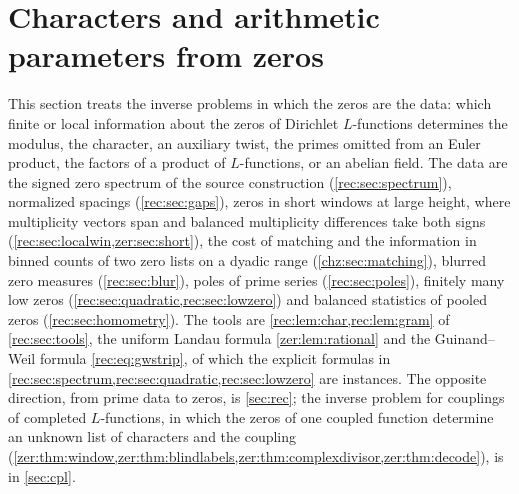 \providecommand{\recsinc}{\operatorname{sinc}}
\providecommand{\recgE}{\gamma_{\mathrm{E}}}
\providecommand{\recGen}{\operatorname{Gen}}
\providecommand{\recav}{\operatorname{av}}
\providecommand{\recA}{\mathcal{A}}
\providecommand{\recartanh}{\operatorname{artanh}}
\providecommand{\zerJ}{\mathcal{J}}
\providecommand{\zerK}{\mathcal{K}}
\providecommand{\zersinc}{\operatorname{sinc}}
\providecommand{\zergE}{\gamma_{\mathrm{E}}}
\providecommand{\zerLL}{\mathcal{L}}
\providecommand{\zerconv}{\operatorname{conv}}
\providecommand{\zerdiag}{\operatorname{diag}}
\providecommand{\zerSym}{\mathfrak{D}}
\providecommand{\zerLog}{\operatorname{Log}}
\providecommand{\chzA}{\mathcal{A}}
\providecommand{\chzB}{\mathcal{B}}
\providecommand{\chzC}{\mathcal{C}}
\providecommand{\chzEx}{\mathbb{E}}
\section{Characters and arithmetic parameters from zeros}\label{sec:chz}

This section treats the inverse problems in which the zeros are the data: which finite or local
information about the zeros of Dirichlet $L$-functions determines the modulus, the character, an
auxiliary twist, the primes omitted from an Euler product, the factors of a product of
$L$-functions, or an abelian field. The data are the signed zero spectrum of
the source construction (\cref{rec:sec:spectrum}), normalized spacings (\cref{rec:sec:gaps}), zeros in
short windows at large height, where multiplicity vectors span and balanced multiplicity differences
take both signs (\cref{rec:sec:localwin,zer:sec:short}), the cost of matching and the information in binned
counts of two zero lists on a dyadic range (\cref{chz:sec:matching}), blurred zero measures (\cref{rec:sec:blur}),
poles of prime series (\cref{rec:sec:poles}), finitely many low zeros
(\cref{rec:sec:quadratic,rec:sec:lowzero}) and balanced statistics of pooled zeros
(\cref{rec:sec:homometry}). The tools are \cref{rec:lem:char,rec:lem:gram} of \cref{rec:sec:tools}, the
uniform Landau formula \cref{zer:lem:rational} and the Guinand--Weil formula \eqref{rec:eq:gwstrip},
of which the explicit formulas in \cref{rec:sec:spectrum,rec:sec:quadratic,rec:sec:lowzero} are
instances. The opposite direction, from prime
data to zeros, is \cref{sec:rec}; the inverse problem for couplings of completed $L$-functions, in which
the zeros of one coupled function determine an unknown list of characters and the coupling
(\cref{zer:thm:window,zer:thm:blindlabels,zer:thm:complexdivisor,zer:thm:decode}), is in \cref{sec:cpl}.

